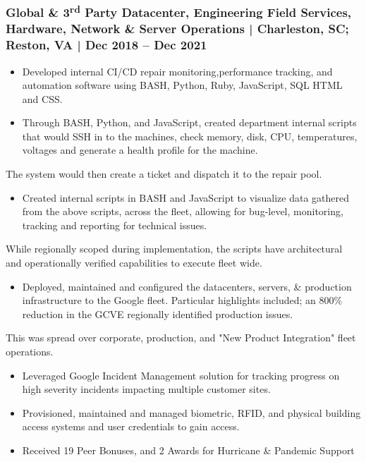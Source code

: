 \documentclass[letter,10pt]{article}
\begin{document}
\subsubsection*{Global \& 3\textsuperscript{rd} Party Datacenter, Engineering Field Services, Hardware, Network \& Server Operations | Charleston, SC; Reston, VA | Dec 2018 – Dec 2021}
\label{sec:org6f42c72}
\begin{itemize}
\item Developed internal CI/CD repair monitoring,performance tracking, and automation software using BASH, Python, Ruby, JavaScript, SQL HTML and CSS.
\item Through BASH, Python, and JavaScript, created department internal scripts that would SSH in to the machines, check memory, disk, CPU, temperatures, voltages and generate a health profile for the machine.
\end{itemize}
The system would then create a ticket and dispatch it to the repair pool.
\begin{itemize}
\item Created internal scripts in BASH and JavaScript to visualize data gathered from the above scripts, across the fleet, allowing for bug-level, monitoring, tracking and reporting for technical issues.
\end{itemize}
While regionally scoped during implementation, the scripts have architectural and operationally verified capabilities to execute fleet wide. 
\begin{itemize}
\item Deployed, maintained and configured the datacenters, servers, \& production infrastructure to the Google fleet. Particular highlights included; an 800\% reduction in the GCVE regionally identified production issues.
\end{itemize}
This was spread over corporate, production, and "New Product Integration" fleet operations. 
\begin{itemize}
\item Leveraged Google Incident Management solution for tracking progress on high severity incidents impacting multiple customer sites.
\item Provisioned, maintained and managed biometric, RFID, and physical building access systems and user credentials to gain access.
\item Received 19 Peer Bonuses, and 2 Awards for Hurricane \& Pandemic Support
\end{itemize}
\end{document}
